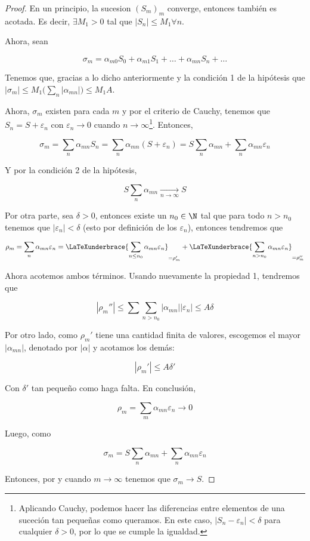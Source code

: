 \begin{proof}
    En un principio, la sucesion $(S_m)_m$ converge, entonces también es acotada. Es decir, $\exists M_1 > 0$ tal que $|S_n| \leq M_1 \forall n$.

    Ahora, sean

    \[
        \sigma_m = \alpha_{m0}S_0 + \alpha_{m1}S_1 + \dots + \alpha_{mn}S_n + \dots
    \]

    Tenemos que, gracias a lo dicho anteriormente y la condición 1 de la hipótesis que $|\sigma_m| \leq M_1 \big( \sum_n |\alpha_{mn}| \big) \leq M_1A$.

    Ahora, $\sigma_m$ existen para cada $m$ y por el criterio de Cauchy, tenemos que $S_n = S + \varepsilon_n$ con $\varepsilon_n \to 0$ cuando $n \to \infty$\footnote{Aplicando Cauchy, podemos hacer las diferencias entre elementos de una suceción tan pequeñas como queramos. En este caso, $|S_n - \varepsilon_n| < \delta$ para cualquier $\delta > 0$, por lo que se cumple la igualdad.}. Entonces,

    \[
        \sigma_m = \sum_{n} \alpha_{mn}S_n = \sum_{n} \alpha_{mn}(S + \varepsilon_n) = S\sum_{n} \alpha_{mn} + \sum_{n} \alpha_{mn} \varepsilon_n
    \]

    Y por la condición 2 de la hipótesis,

    \begin{equation}\label{eq:811}
        S\sum_{n} \alpha_{mn} \xrightarrow[n \to \infty]{} S
    \end{equation}

    Por otra parte, sea $\delta > 0$, entonces existe un $n_0 \in \N$ tal que para todo $n > n_0$ tenemos que $|\varepsilon_n| < \delta$ (esto por definición de los $\varepsilon_n$), entonces tendremos que

    \[
          \rho_m = \sum_{n} \alpha_{mn} \varepsilon_n = \LaTeXunderbrace{\sum_{n \leq n_0} \alpha_{mn} \varepsilon_n}_{=\rho_m'} + \LaTeXunderbrace{\sum_{n > n_0} \alpha_{mn} \varepsilon_n}_{=\rho_m''}
    \]

    Ahora acotemos ambos términos. Usando nuevamente la propiedad 1, tendremos que

    \[
        |\rho_m''| \leq \sum \sum_{n > n_0} |\alpha_{mn}| |\varepsilon_n| \leq A\delta
    \]

    Por otro lado, como $\rho_m'$ tiene una cantidad finita de valores, escogemos el mayor $|\alpha_{mn}|$, denotado por $|\alpha|$ y acotamos los demás:

    \[
        |\rho_m'| \leq A\delta'
    \]

    Con $\delta'$ tan pequeño como haga falta. En conclusión,

    \begin{equation}\label{eq:812}
        \rho_m = \sum_m \alpha_{mn}\varepsilon_n \rightarrow 0
    \end{equation}

    Luego, como 

    \[
        \sigma_m = S\sum_{n} \alpha_{mn} + \sum_{n} \alpha_{mn} \varepsilon_n
    \]

    Entonces, por  y  cuando $m \to \infty$ tenemos que $\sigma_m \to S$.
\end{proof}

